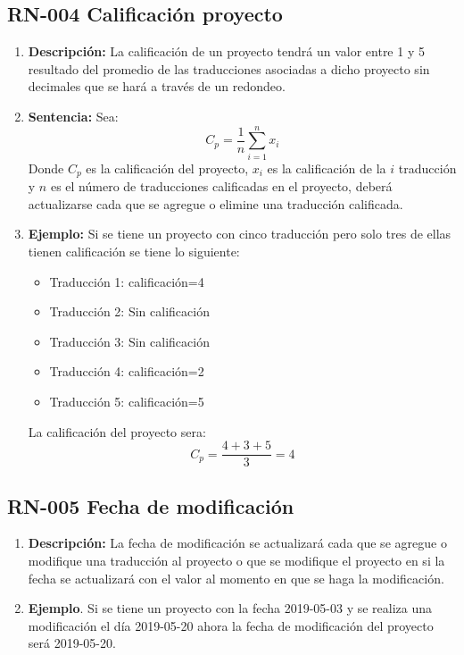 \subsection{RN-004 Calificación proyecto} \label{RN004}
    \begin{enumerate}[label= ]
        \item \textbf{Descripción:} La calificación de un proyecto tendrá un valor entre 1 y 5 resultado del promedio de las traducciones asociadas a dicho proyecto sin decimales que se hará a través de un redondeo.
        \item \textbf{Sentencia:} Sea: \\
        \[ C_p = \frac{1}{n} \sum_{i=1}^{n} x_i \]
        Donde $C_p$ es la calificación del proyecto, $x_i$ es la calificación de la $i$ traducción y $n$ es el número de traducciones calificadas en el proyecto, deberá actualizarse cada que se agregue o elimine una traducción calificada.
         \item \textbf{Ejemplo:} Si se tiene un proyecto con cinco traducción pero solo tres de ellas tienen calificación se tiene lo siguiente:
         \begin{itemize}
             \item Traducción 1: calificación=4
             \item Traducción 2: Sin calificación
             \item Traducción 3: Sin calificación
             \item Traducción 4: calificación=2
             \item Traducción 5: calificación=5
         \end{itemize}
         La calificación del proyecto sera:
           \[ C_p= \frac{4+3+5}{3} = 4 \]
    \end{enumerate}

\subsection{RN-005 Fecha de modificación} \label{RN005}
    \begin{enumerate}[label= ]
        \item \textbf{Descripción:} La fecha de modificación se actualizará cada que se agregue o modifique una traducción al proyecto o que se modifique el proyecto en si la fecha se actualizará con el valor al momento en que se haga la modificación.
       \item \textbf{Ejemplo}. Si se tiene un proyecto con la fecha 2019-05-03 y se realiza una modificación el día 2019-05-20 ahora la fecha de modificación del proyecto será 2019-05-20.
    \end{enumerate}
    
